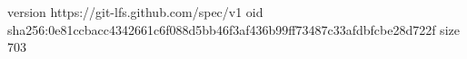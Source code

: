 version https://git-lfs.github.com/spec/v1
oid sha256:0e81ccbacc4342661c6f088d5bb46f3af436b99ff73487c33afdbfcbe28d722f
size 703
